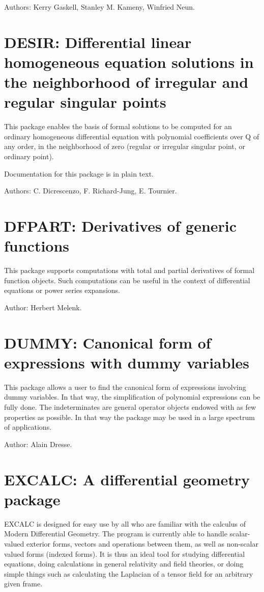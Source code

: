 Authors: Kerry Gaskell, Stanley M. Kameny, Winfried Neun.

\section{DESIR: Differential linear homogeneous equation solutions in the
              neighborhood of irregular and regular singular points}

This package enables the basis of formal solutions to be computed for an
ordinary homogeneous differential equation with polynomial coefficients
over Q of any order, in the neighborhood of zero (regular or irregular
singular point, or ordinary point).

Documentation for this package is in plain text.

Authors: C. Dicrescenzo, F. Richard-Jung, E. Tournier.

\section{DFPART: Derivatives of generic functions}

This package supports computations with total and partial derivatives of
formal function objects.  Such computations can be useful in the context
of differential equations or power series expansions.

Author: Herbert Melenk.

\section{DUMMY: Canonical form of expressions with dummy variables}

This package allows a user to find the canonical form of expressions
involving dummy variables. In that way, the simplification of
polynomial expressions can be fully done. The indeterminates are general
operator objects endowed with as few properties as possible. In that way
the package may be used in a large spectrum of applications.

Author: Alain Dresse.

\section{EXCALC: A differential geometry package} 

EXCALC is designed for easy use by all who are familiar with the calculus
of Modern Differential Geometry. The program is currently able to handle
scalar-valued exterior forms, vectors and operations between them, as well
as non-scalar valued forms (indexed forms). It is thus an ideal tool for
studying differential equations, doing calculations in general relativity
and field theories, or doing simple things such as calculating the
Laplacian of a tensor field for an arbitrary given frame.

